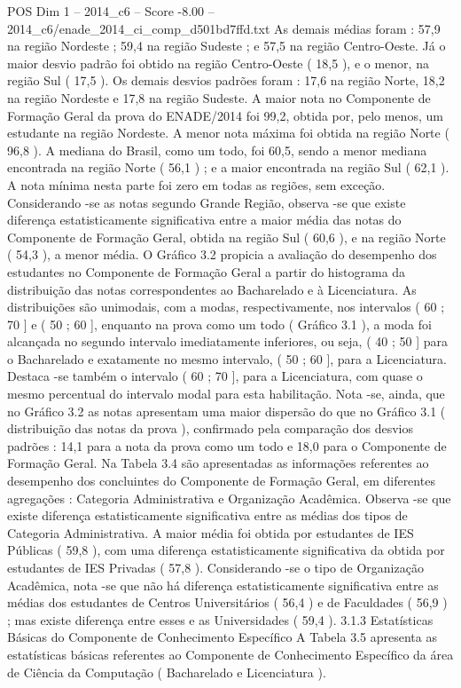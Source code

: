 \begin{textsample}{POS Dim 1 – 2014\_c6 – Score -8.00 – 2014\_c6/enade\_2014\_ci\_comp\_d501bd7ffd.txt}
As demais médias foram : 57,9 na região Nordeste ; 59,4 na região Sudeste ; e 57,5 na região Centro-Oeste.
Já o maior desvio padrão foi obtido na região Centro-Oeste ( 18,5 ), e o menor, na região Sul ( 17,5 ).
Os demais desvios padrões foram : 17,6 na região Norte, 18,2 na região Nordeste e 17,8 na região Sudeste.
A maior nota no Componente de Formação Geral da prova do ENADE/2014 foi 99,2, obtida por, pelo menos, um estudante na região Nordeste.
A menor nota máxima foi obtida na região Norte ( 96,8 ).
A mediana do Brasil, como um todo, foi 60,5, sendo a menor mediana encontrada na região Norte ( 56,1 ) ; e a maior encontrada na região Sul ( 62,1 ).
A nota mínima nesta parte foi zero em todas as regiões, sem exceção.
Considerando -se as notas segundo Grande Região, observa -se que existe diferença estatisticamente significativa entre a maior média das notas do Componente de Formação Geral, obtida na região Sul ( 60,6 ), e na região Norte ( 54,3 ), a menor média.
O Gráfico 3.2 propicia a avaliação do desempenho dos estudantes no Componente de Formação Geral a partir do histograma da distribuição das notas correspondentes ao Bacharelado e à Licenciatura.
As distribuições são unimodais, com a modas, respectivamente, nos intervalos ( 60 ; 70 ] e ( 50 ; 60 ], enquanto na prova como um todo ( Gráfico 3.1 ), a moda foi alcançada no segundo intervalo imediatamente inferiores, ou seja, ( 40 ; 50 ] para o Bacharelado e exatamente no mesmo intervalo, ( 50 ; 60 ], para a Licenciatura.
Destaca -se também o intervalo ( 60 ; 70 ], para a Licenciatura, com quase o mesmo percentual do intervalo modal para esta habilitação.
Nota -se, ainda, que no Gráfico 3.2 as notas apresentam uma maior dispersão do que no Gráfico 3.1 ( distribuição das notas da prova ), confirmado pela comparação dos desvios padrões : 14,1 para a nota da prova como um todo e 18,0 para o Componente de Formação Geral.
Na Tabela 3.4 são apresentadas as informações referentes ao desempenho dos concluintes do Componente de Formação Geral, em diferentes agregações : Categoria Administrativa e Organização Acadêmica.
Observa -se que existe diferença estatisticamente significativa entre as médias dos tipos de Categoria Administrativa.
A maior média foi obtida por estudantes de IES Públicas ( 59,8 ), com uma diferença estatisticamente significativa da obtida por estudantes de IES Privadas ( 57,8 ).
Considerando -se o tipo de Organização Acadêmica, nota -se que não há diferença estatisticamente significativa entre as médias dos estudantes de Centros Universitários ( 56,4 ) e de Faculdades ( 56,9 ) ; mas existe diferença entre esses e as Universidades ( 59,4 ). 3.1.3 Estatísticas Básicas do Componente de Conhecimento Específico A Tabela 3.5 apresenta as estatísticas básicas referentes ao Componente de Conhecimento Específico da área de Ciência da Computação ( Bacharelado e Licenciatura ).

\end{textsample}
